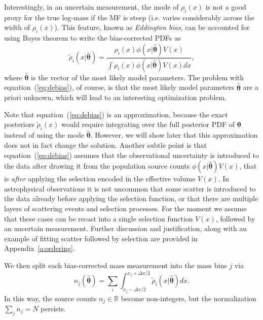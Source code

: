 \documentclass[a4paper,fleqn,usenatbib]{mnras}
\newcommand{\be}{\begin{equation}}
\newcommand{\ee}{\end{equation}}
\newcommand{\Dx}{\Delta x}
\newcommand{\dx}{dx}
\newcommand{\veff}{V}%
\newcommand{\eq}[1]{equation~(\ref{eq:#1})}
\renewcommand{\a}[1]{Appendix~\ref{a:#1}}
\newcommand{\ie}{i.e.\xspace}
\newcommand{\para}{{\bm{\theta}}}
\begin{document}
Interestingly, in an uncertain measurement, the mode of $\rho_i(x)$ is not a good proxy for the true log-mass if the MF is steep (\ie varies considerably across the width of $\rho_i(x)$). This feature, known as \emph{Eddington bias}, can be accounted for using Bayes theorem to write the bias-corrected PDFs as
\be\label{eq:debias}
	\tilde{\rho}_i(x|\hat\para) = \frac{\rho_i(x)\phi(x|\hat\para)\veff(x)}{\int\rho_i(x)\phi(x|\hat\para)\veff(x)\dx},
\ee
where $\hat\para$ is the vector of the most likely model parameters. The problem with \eq{debias}, of course, is that the most likely model parameters $\hat\para$ are a priori unknown, which will lead to an interesting optimization problem.

Note that \eq{debias} is an approximation, because the exact posteriors $\tilde{\rho}_i(x)$ would require integrating over the full posterior PDF of $\para$ instead of using the mode $\hat\para$. However, we will show later that this approximation does not in fact change the solution. Another subtle point is that \eq{debias} assumes that the observational uncertainty is introduced to the data after drawing it from the population source counts $\phi(x|\hat\para)\veff(x)$, that is \emph{after} applying the selection encoded in the effective volume $\veff(x)$. In astrophysical observations it is not uncommon that some scatter is introduced to the data already before applying the selection function, or that there are multiple layers of scattering events and selection processes. For the moment we assume that these cases can be recast into a single selection function $\veff(x)$, followed by an uncertain measurement. Further discussion and justification, along with an example of fitting scatter followed by selection are provided in \a{ordering}.

We then split each bias-corrected mass measurement into the mass bins $j$ via
%
\be\label{eq:continuousn}
	n_j(\hat\para)=\sum_i\int_{x_j-\Dx/2}^{x_j+\Dx/2}\tilde{\rho}_i(x|\hat\para)\dx.
\ee
In this way, the source counts $n_j\in\mathbb{R}$ become non-integers, but the normalization $\sum_j n_j=N$ persists.
\end{document}
